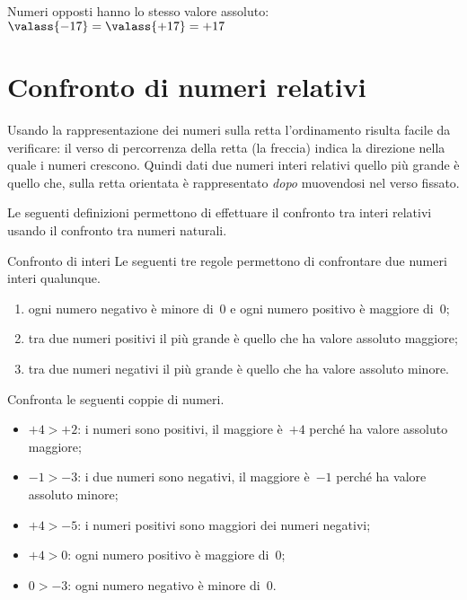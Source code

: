 Numeri opposti hanno lo stesso valore assoluto: \qquad 
\(\valass{-17} = \valass{+17} = +17\)

\section{Confronto di numeri relativi}
\label{sec:int_confronto}

Usando la rappresentazione dei numeri sulla retta l'ordinamento risulta 
facile da verificare:
il verso di percorrenza della retta (la freccia) indica la direzione nella 
quale i numeri crescono.
Quindi dati due numeri interi relativi quello più grande è quello che, sulla 
retta orientata è rappresentato \emph{dopo} muovendosi nel verso fissato.

Le seguenti definizioni permettono di effettuare il confronto tra interi 
relativi usando il confronto tra numeri naturali.

\begin{definizione}{Confronto di interi}{}
Le seguenti tre regole permettono di confrontare due numeri interi qualunque.
\begin{enumerate} [noitemsep] %
\item ogni numero negativo è minore di~0 e ogni numero 
positivo è maggiore di~0;
\item tra due numeri positivi il più grande è quello che ha valore 
assoluto maggiore;
\item tra due numeri negativi il più grande è quello che ha valore 
assoluto minore.
\end{enumerate}

\end{definizione}

\begin{esempio}{}{}
Confronta le seguenti coppie di numeri.
\begin{itemize} [noitemsep]
\item \(+4 > +2\): i numeri sono positivi, il maggiore è~\(+4\) perché ha 
valore assoluto maggiore;
\item \(-1 > -3\): i due numeri sono negativi, il maggiore è~\(-1\) perché 
ha valore assoluto minore;
\item \(+4 > -5\): i numeri positivi sono maggiori dei numeri negativi;
\item \(+4 > 0\): ogni numero positivo è maggiore di~0;
\item \(0 > -3\): ogni numero negativo è minore di~0.
\end{itemize}
\begin{center} \rettaconfronto \end{center}
\end{esempio}

